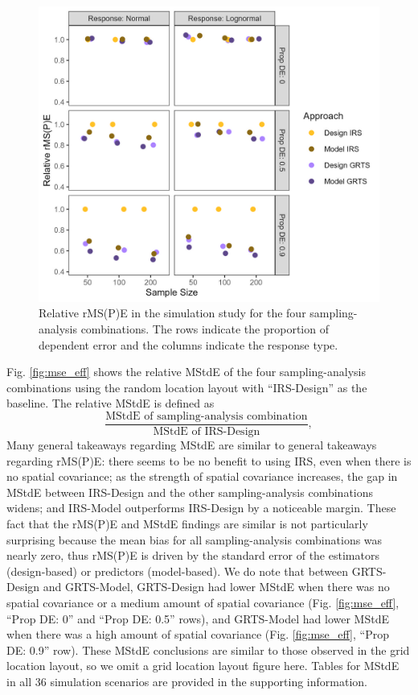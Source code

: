 \documentclass[]{elsarticle} %
\begin{document}
\begin{figure}
  \centering
  \includegraphics[width = 1\linewidth]{figures/rmspe_eff.jpeg}
  \caption{Relative rMS(P)E in the simulation study for the four sampling-analysis combinations. The rows indicate the proportion of dependent error and the columns indicate the response type.}
  \label{fig:rmspe_eff}
\end{figure}

Fig. \ref{fig:mse_eff} shows the relative MStdE of the four
sampling-analysis combinations using the random location layout with
``IRS-Design'' as the baseline. The relative MStdE is defined as
\begin{equation*}
\frac{\text{MStdE of sampling-analysis combination}}{\text{MStdE of IRS-Design}},
\end{equation*} Many general takeaways regarding MStdE are similar to
general takeaways regarding rMS(P)E: there seems to be no benefit to
using IRS, even when there is no spatial covariance; as the strength of
spatial covariance increases, the gap in MStdE between IRS-Design and
the other sampling-analysis combinations widens; and IRS-Model
outperforms IRS-Design by a noticeable margin. These fact that the
rMS(P)E and MStdE findings are similar is not particularly surprising
because the mean bias for all sampling-analysis combinations was nearly
zero, thus rMS(P)E is driven by the standard error of the estimators
(design-based) or predictors (model-based). We do note that between
GRTS-Design and GRTS-Model, GRTS-Design had lower MStdE when there was
no spatial covariance or a medium amount of spatial covariance (Fig.
\ref{fig:mse_eff}, ``Prop DE: 0'' and ``Prop DE: 0.5'' rows), and
GRTS-Model had lower MStdE when there was a high amount of spatial
covariance (Fig. \ref{fig:mse_eff}, ``Prop DE: 0.9'' row). These MStdE
conclusions are similar to those observed in the grid location layout,
so we omit a grid location layout figure here. Tables for MStdE in all
36 simulation scenarios are provided in the supporting information.
\end{document}
